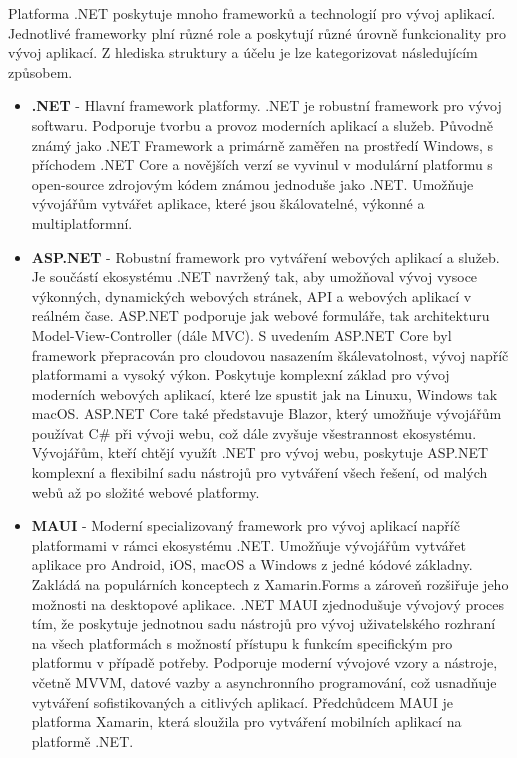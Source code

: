 
Platforma .NET poskytuje mnoho frameworků a technologií pro vývoj aplikací. Jednotlivé frameworky plní různé role a poskytují různé úrovně funkcionality pro vývoj aplikací. Z hlediska struktury a účelu je lze kategorizovat následujícím způsobem. \cite{netdocs}

\begin{itemize}
    \item \textbf{.NET} - Hlavní framework platformy. .NET je robustní framework pro vývoj softwaru. Podporuje tvorbu a provoz moderních aplikací a služeb. Původně známý jako .NET Framework a primárně zaměřen na prostředí Windows, s příchodem .NET Core a novějších verzí se vyvinul v modulární platformu s open-source zdrojovým kódem známou jednoduše jako .NET. Umožňuje vývojářům vytvářet aplikace, které jsou škálovatelné, výkonné a multiplatformní.
    \item \textbf{ASP.NET} - Robustní framework pro vytváření webových aplikací a služeb. Je součástí ekosystému .NET navržený tak, aby umožňoval vývoj vysoce výkonných, dynamických webových stránek, API a webových aplikací v reálném čase. ASP.NET podporuje jak webové formuláře, tak architekturu Model-View-Controller (dále MVC). S uvedením ASP.NET Core byl framework přepracován pro cloudovou nasazením škálevatolnost, vývoj napříč platformami a vysoký výkon. Poskytuje komplexní základ pro vývoj moderních webových aplikací, které lze spustit jak na Linuxu, Windows tak macOS. ASP.NET Core také představuje Blazor, který umožňuje vývojářům používat C\# při vývoji webu, což dále zvyšuje všestrannost ekosystému. Vývojářům, kteří chtějí využít .NET pro vývoj webu, poskytuje ASP.NET komplexní a flexibilní sadu nástrojů pro vytváření všech řešení, od malých webů až po složité webové platformy. \cite{Danylko2023}
    \item \textbf{MAUI} - Moderní specializovaný framework pro vývoj aplikací napříč platformami v rámci ekosystému .NET. Umožňuje vývojářům vytvářet aplikace pro Android, iOS, macOS a Windows z jedné kódové základny. Zakládá na populárních konceptech z Xamarin.Forms a zároveň rozšiřuje jeho možnosti na desktopové aplikace. .NET MAUI zjednodušuje vývojový proces tím, že poskytuje jednotnou sadu nástrojů pro vývoj uživatelského rozhraní na všech platformách s možností přístupu k funkcím specifickým pro platformu v případě potřeby. Podporuje moderní vývojové vzory a nástroje, včetně MVVM, datové vazby a asynchronního programování, což usnadňuje vytváření sofistikovaných a citlivých aplikací. Předchůdcem MAUI je platforma Xamarin, která sloužila pro vytváření mobilních aplikací na platformě .NET. \cite{Libery2023}

\end{itemize}
